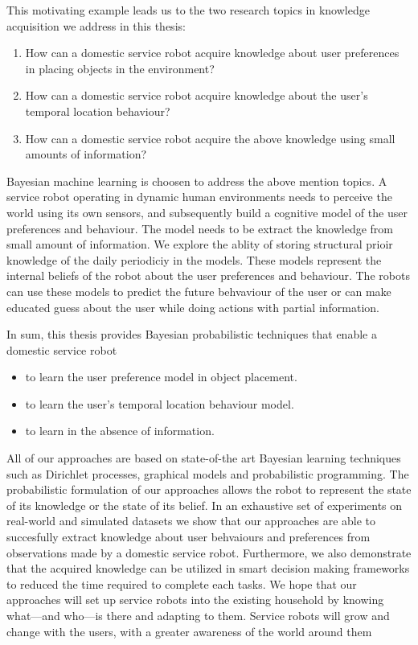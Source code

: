 \documentclass[11pt]{book}
\begin{document}
This motivating example leads us to the two research topics in knowledge acquisition we address in this thesis:
\begin{enumerate}
	\item How can a domestic service robot acquire knowledge about user preferences in placing objects in the environment?
	\item How can a domestic service robot acquire knowledge about the user's temporal location behaviour?
	\item How can a domestic service robot acquire the above knowledge using small amounts of information?
\end{enumerate}

Bayesian machine learning is choosen to address the above mention topics. A service robot operating in dynamic human environments needs to perceive the world using its own sensors, and subsequently build a cognitive model of the user preferences and behaviour. The model needs to be extract the knowledge from small amount of information. We explore the ablity of storing structural prioir knowledge of the daily periodiciy in the models.
These models represent the internal beliefs of the robot about the user preferences and behaviour. The robots can use these models to predict the future behvaviour of the user or can make educated guess about the user while doing actions with partial information.

In sum, this thesis provides Bayesian probabilistic techniques that enable a domestic service robot
\begin{itemize}
	\item to learn the user preference model in object placement.
	\item to learn the user's temporal location behaviour model.
	\item to learn in the absence of information.
\end{itemize}


All of our approaches are based on state-of-the art Bayesian learning techniques such as Dirichlet processes, graphical models and probabilistic programming. The probabilistic formulation of our approaches allows the robot to represent the state of its knowledge or the state of its belief. In an exhaustive set of experiments on real-world and simulated datasets we show that our approaches are able to succesfully extract knowledge about user behvaiours and preferences from observations made by a domestic service robot. Furthermore, we also demonstrate that the acquired knowledge can be utilized in smart decision making frameworks to reduced the time required to complete each tasks. We hope that our approaches will set up service robots into the existing household by knowing what—and who—is there and adapting to them. Service robots will grow and change with the users, with a greater awareness of the world around them
\end{document}

